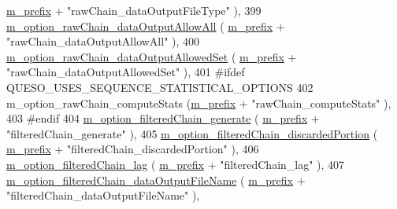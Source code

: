 \begin{DoxyCode}
      \hyperlink{class_q_u_e_s_o_1_1_metropolis_hastings_s_g_options_a4f7c510aaa530336d24259e2a89f5d0b}{m\_prefix} + \textcolor{stringliteral}{"rawChain\_dataOutputFileType"}               ),
399   \hyperlink{class_q_u_e_s_o_1_1_metropolis_hastings_s_g_options_a336b749a8e06848243cf5bfbab2e43a6}{m\_option\_rawChain\_dataOutputAllowAll}               (
      \hyperlink{class_q_u_e_s_o_1_1_metropolis_hastings_s_g_options_a4f7c510aaa530336d24259e2a89f5d0b}{m\_prefix} + \textcolor{stringliteral}{"rawChain\_dataOutputAllowAll"}               ),
400   \hyperlink{class_q_u_e_s_o_1_1_metropolis_hastings_s_g_options_a53a51bf8aa24d9dbe4a9115453bd9e2b}{m\_option\_rawChain\_dataOutputAllowedSet}             (
      \hyperlink{class_q_u_e_s_o_1_1_metropolis_hastings_s_g_options_a4f7c510aaa530336d24259e2a89f5d0b}{m\_prefix} + \textcolor{stringliteral}{"rawChain\_dataOutputAllowedSet"}             ),
401 \textcolor{preprocessor}{#ifdef QUESO\_USES\_SEQUENCE\_STATISTICAL\_OPTIONS}
402 \textcolor{preprocessor}{}  m\_option\_rawChain\_computeStats                     (\hyperlink{class_q_u_e_s_o_1_1_metropolis_hastings_s_g_options_a4f7c510aaa530336d24259e2a89f5d0b}{m\_prefix} + \textcolor{stringliteral}{"rawChain\_computeStats"}           
                ),
403 \textcolor{preprocessor}{#endif}
404 \textcolor{preprocessor}{}  \hyperlink{class_q_u_e_s_o_1_1_metropolis_hastings_s_g_options_abb60803a2ba0d32816a1ac9ad67fe7fd}{m\_option\_filteredChain\_generate}                    (
      \hyperlink{class_q_u_e_s_o_1_1_metropolis_hastings_s_g_options_a4f7c510aaa530336d24259e2a89f5d0b}{m\_prefix} + \textcolor{stringliteral}{"filteredChain\_generate"}                    ),
405   \hyperlink{class_q_u_e_s_o_1_1_metropolis_hastings_s_g_options_a6bc7417585b95eb59cedece39b5d5361}{m\_option\_filteredChain\_discardedPortion}            (
      \hyperlink{class_q_u_e_s_o_1_1_metropolis_hastings_s_g_options_a4f7c510aaa530336d24259e2a89f5d0b}{m\_prefix} + \textcolor{stringliteral}{"filteredChain\_discardedPortion"}            ),
406   \hyperlink{class_q_u_e_s_o_1_1_metropolis_hastings_s_g_options_aa3e984a031cf626281bccd866e603865}{m\_option\_filteredChain\_lag}                         (
      \hyperlink{class_q_u_e_s_o_1_1_metropolis_hastings_s_g_options_a4f7c510aaa530336d24259e2a89f5d0b}{m\_prefix} + \textcolor{stringliteral}{"filteredChain\_lag"}                         ),
407   \hyperlink{class_q_u_e_s_o_1_1_metropolis_hastings_s_g_options_a340a0e9c2b5c2bec86d143cb0f8d64f6}{m\_option\_filteredChain\_dataOutputFileName}          (
      \hyperlink{class_q_u_e_s_o_1_1_metropolis_hastings_s_g_options_a4f7c510aaa530336d24259e2a89f5d0b}{m\_prefix} + \textcolor{stringliteral}{"filteredChain\_dataOutputFileName"}          ),

\end{DoxyCode}
